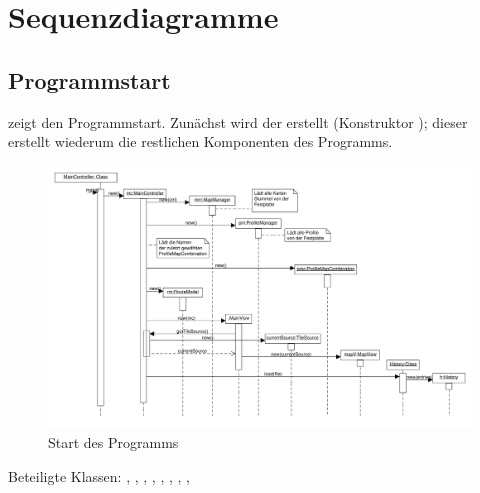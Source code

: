 \documentclass[a4paper, 11pt]{article}
\begin{document}
\section{Sequenzdiagramme}

\subsection{Programmstart}
 zeigt den Programmstart.
Zunächst wird der  erstellt (Konstruktor );
dieser erstellt wiederum die restlichen Komponenten des Programms.
\begin{figure}[H]
\centering
\includegraphics[angle=90, width=\textwidth]{StartSequenz}
\caption{Start des Programms}
\label{fig:sequenz_start}
\end{figure}
Beteiligte Klassen: , , , , , , , , 
\end{document}
